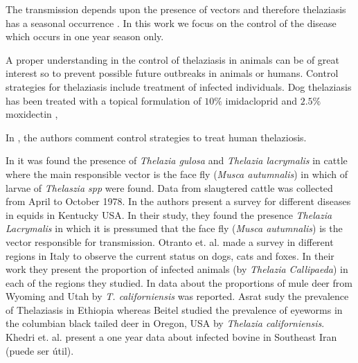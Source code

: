 \documentclass[preprint, 12pt]{elsarticle}
\begin{document}
\noindent The transmission depends upon the presence of vectors and therefore thelaziasis has a seasonal occurrence \cite{Asrat:2016}. In this work we focus on the control of the disease which occurs in one year season only.

\noindent A proper understanding in the control of thelaziasis in animals can be of great interest so to prevent possible future outbreaks in animals or humans. Control strategies for thelaziasis include treatment of infected individuals. Dog thelaziasis has been treated with a topical formulation of $10\%$ imidacloprid and $2.5\%$ moxidectin \cite{Bianciardi:2005},


In \cite{shen:2006}, the authors comment control strategies to treat human thelaziosis.






\noindent In \cite{Moolenbeek:1980} it was found the presence of \textit{Thelazia gulosa} and \textit{Thelazia lacrymalis} in cattle where the main responsible vector is the face fly (\textit{Musca autumnalis}) in which of larvae of \textit{Thelaszia spp} were found. Data from slaugtered cattle was collected from April to October 1978. In \cite{Lyons:2000} the authors present a survey for different diseases in equids in Kentucky USA. In their study, they found the presence \textit{Thelazia Lacrymalis} in which it is pressumed that the face fly (\textit{Musca autumnalis}) is the vector responsible for transmission. Otranto et. al. \cite{Otranto:2003} made a survey in different regions in Italy to observe the current status on dogs, cats and foxes. In their work they present the proportion of infected animals (by \textit{Thelazia Callipaeda}) in each of the regions they studied. In \cite{Dubay:2000} data about the proportions of mule deer from Wyoming and Utah by \textit{T. californiensis} was reported. Asrat \cite{Asrat:2016} sudy the prevalence of Thelaziasis in Ethiopia whereas Beitel \cite{Beitel:1974} studied the prevalence of eyeworms in the columbian black tailed deer in Oregon, USA by \textit{Thelazia californiensis}. Khedri et. al. \cite{Khedri:2016} present a one year data about infected bovine in Southeast Iran (puede ser útil).
\end{document}
